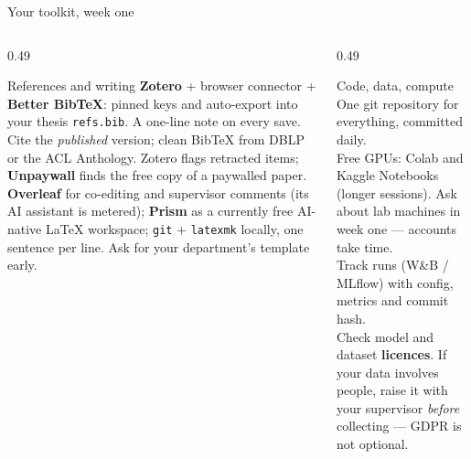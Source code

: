 \documentclass[aspectratio=169,11pt]{beamer}
\newcommand{\code}[1]{\texttt{\small #1}}
\newcommand{\key}[1]{\textbf{\color{brand}#1}}
\begin{document}
\begin{frame}{Your toolkit, week one}
\begin{columns}[T]
\begin{column}{0.49\textwidth}
\begin{block}{References and writing}
\footnotesize
\key{Zotero} + browser connector + \key{Better BibTeX}: pinned keys and
auto-export into your thesis \code{refs.bib}. A one-line note on every save.
Cite the \emph{published} version; clean BibTeX from DBLP or the ACL
Anthology. Zotero flags retracted items; \key{Unpaywall} finds the free copy
of a paywalled paper.\\[4pt]
\key{Overleaf} for co-editing and supervisor comments (its AI assistant is
metered); \key{Prism} as a currently free AI-native LaTeX workspace; \code{git} + \code{latexmk} locally, one sentence
per line. Ask for your department's template early.
\end{block}
\end{column}
\begin{column}{0.49\textwidth}
\begin{block}{Code, data, compute}
\footnotesize
One git repository for everything, committed daily.\\[3pt]
Free GPUs: Colab and Kaggle Notebooks (longer sessions). Ask about lab machines
in week one --- accounts take time.\\[3pt]
Track runs (W\&B / MLflow) with config, metrics and commit hash.\\[3pt]
Check model and dataset \key{licences}. If your data involves people, raise it
with your supervisor \emph{before} collecting --- GDPR is not optional.
\end{block}
\end{column}
\end{columns}
\end{frame}
\end{document}
